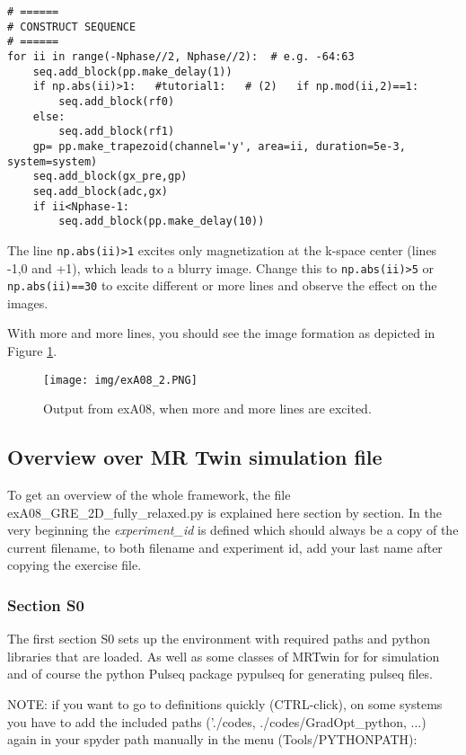 \documentclass[a4paper,12pt]{extarticle}
\begin{document}
\begin{verbatim}
# ======
# CONSTRUCT SEQUENCE
# ======
for ii in range(-Nphase//2, Nphase//2):  # e.g. -64:63
    seq.add_block(pp.make_delay(1))
    if np.abs(ii)>1:   #tutorial1:   # (2)   if np.mod(ii,2)==1:    
        seq.add_block(rf0)
    else:
        seq.add_block(rf1)
    gp= pp.make_trapezoid(channel='y', area=ii, duration=5e-3, system=system)
    seq.add_block(gx_pre,gp)
    seq.add_block(adc,gx)
    if ii<Nphase-1:
        seq.add_block(pp.make_delay(10))
\end{verbatim}

The line \texttt{np.abs(ii)>1} excites only magnetization at the k-space center (lines -1,0 and +1), which leads to a blurry image. Change this to \texttt{np.abs(ii)>5} or \texttt{np.abs(ii)==30}  to excite different or more lines and observe the effect on the images.


With more and more lines, you should see the image formation as depicted in Figure \ref{fig:exA09_2}.

\begin{figure}[!ht] 
\centering
\texttt{[image: img/exA08\_2.PNG]}
\caption{Output from exA08, when more and more lines are excited.} \label{fig:exA09_2}
\end{figure}

\newpage 

\subsection{Overview over MR Twin simulation file}

To get an overview of the whole framework, the file exA08\_GRE\_2D\_fully\_relaxed.py is explained here section by section. In the very beginning the \emph{experiment\_id} is defined which should always be a copy of the current filename, to both filename and experiment id, add your last name after copying the exercise file. 

\subsubsection{Section S0}
The first section S0 sets up the environment with required paths and python libraries that are loaded. As well as some classes of MRTwin for for simulation and of course the python Pulseq package pypulseq for generating pulseq files.

NOTE: if you want to go to definitions quickly (CTRL-click), on some systems you have to add the included paths ('./codes, ./codes/GradOpt\_python, ...)  again in your spyder path manually in the menu (Tools/PYTHONPATH):
\end{document}
